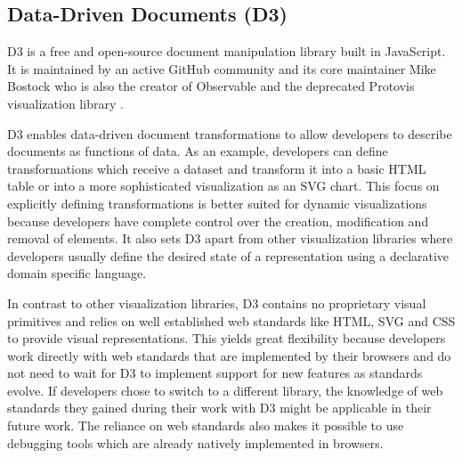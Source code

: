 \subsection{Data-Driven Documents (D3)}

D3 \parencite{D3} is a free and open-source document manipulation library built in JavaScript.
It is maintained by an active GitHub community and its core maintainer Mike Bostock who is also the creator of Observable \parencite{Observable} and the deprecated Protovis visualization library \parencite{Protovis}.

D3 enables data-driven document transformations to allow developers to describe documents as functions of data.
As an example, developers can define transformations which receive a dataset and transform it into a basic HTML table or into a more sophisticated visualization as an SVG chart.
This focus on explicitly defining transformations is better suited for dynamic visualizations because developers have complete control over the creation, modification and removal of elements.
It also sets D3 apart from other visualization libraries where developers usually define the desired state of a representation using a declarative domain specific language.

In contrast to other visualization libraries, D3 contains no proprietary visual primitives and relies on well established web standards like HTML, SVG and CSS to provide visual representations.
This yields great flexibility because developers work directly with web standards that are implemented by their browsers and do not need to wait for D3 to implement support for new features as standards evolve.
If developers chose to switch to a different library, the knowledge of web standards they gained during their work with D3 might be applicable in their future work.
The reliance on web standards also makes it possible to use debugging tools which are already natively implemented in browsers.

